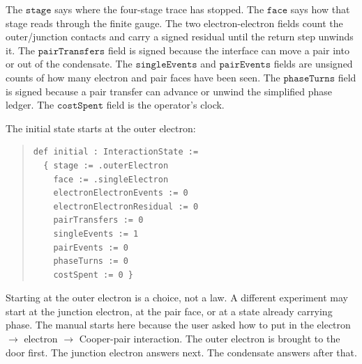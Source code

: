 The \(\texttt{stage}\) says where the four-stage trace has stopped. The \(\texttt{face}\) says how that stage
reads through the finite gauge. The two electron-electron fields count the outer/junction contacts and carry a
signed residual until the return step unwinds it. The \(\texttt{pairTransfers}\) field is signed because the
interface can move a pair into or out of the condensate. The \(\texttt{singleEvents}\) and
\(\texttt{pairEvents}\) fields are unsigned counts of how many electron and pair faces have been seen. The
\(\texttt{phaseTurns}\) field is signed because a pair transfer can advance or unwind the simplified phase
ledger. The \(\texttt{costSpent}\) field is the operator's clock.

The initial state starts at the outer electron:

\begin{quote}\small
\begin{verbatim}
def initial : InteractionState :=
  { stage := .outerElectron
    face := .singleElectron
    electronElectronEvents := 0
    electronElectronResidual := 0
    pairTransfers := 0
    singleEvents := 1
    pairEvents := 0
    phaseTurns := 0
    costSpent := 0 }
\end{verbatim}
\end{quote}

Starting at the outer electron is a choice, not a law. A different experiment may start at the junction electron,
at the pair face, or at a state already carrying phase. The manual starts here because the user asked how to put
in the electron \(\to\) electron \(\to\) Cooper-pair interaction. The outer electron is brought to the door
first. The junction electron answers next. The condensate answers after that.
